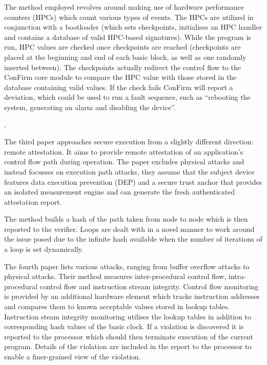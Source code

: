 The method employed revolves around making use of hardware performance counters (HPCs) which count various types of events. The HPCs are utilized in conjunction with a bootloader (which sets checkpoints, initialises an HPC handler and contains a database of valid HPC-based signatures). While the program is run, HPC values are checked once checkpoints are reached (checkpoints are placed at the beginning and end of each basic block, as well as one randomly inserted between). The checkpoints actually redirect the control flow to the ConFirm core module to compare the HPC value with those stored in the database containing valid values. If the check fails ConFirm will report a deviation, which could be used to run a fault sequence, such as ``rebooting the system, generating an alarm and disabling the device''.

\ifnotesincluded
{}.
\fi

The third paper \cite{Abera2016} approaches secure execution from a slightly different direction: remote attestation. It aims to provide remote attestation of an application's control flow path during operation. The paper excludes physical attacks and instead focusses on execution path attacks, they assume that the subject device features data execution prevention (DEP) and a secure trust anchor that provides an isolated measurement engine and can generate the fresh authenticated attestation report.

\ifnotesincluded
{}
\fi

The method builds a hash of the path taken from node to node which is then reported to the verifier. Loops are dealt with in a novel manner to work around the issue posed due to the infinite hash available when the number of iterations of a loop is set dynamically.

\ifnotesincluded
{}
\fi

The fourth paper \cite{Arora2006} lists various attacks, ranging from buffer overflow attacks to physical attacks. Their method measures inter-procedural control flow, intra-procedural control flow and instruction stream integrity. Control flow monitoring is provided by an additional hardware element which tracks instruction addresses and compares them to known acceptable values stored in lookup tables. Instruction steam integrity monitoring utilises the lookup tables in addition to corresponding hash values of the basic clock. If a violation is discovered it is reported to the processor which should then terminate execution of the current program. Details of the violation are included in the report to the processor to enable a finer-grained view of the violation.


